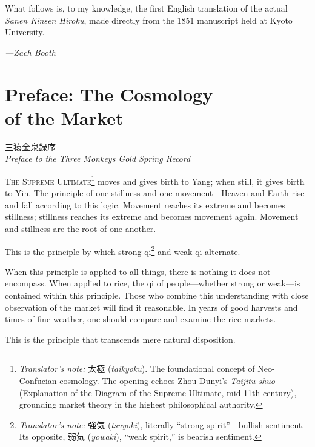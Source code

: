 \documentclass[10pt, openany]{book}
\newcommand{\jp}[1]{{\japanesefont #1}}
\newcommand{\tn}[1]{\footnote{\textit{Translator's note:} #1}}
\begin{document}
What follows is, to my knowledge, the first English translation of the
actual \textit{Sanen Kinsen Hiroku}, made directly from the 1851
manuscript held at Kyoto University.

\vspace{1em}
\begin{flushright}
\textit{---Zach Booth}
\end{flushright}

\chapter{Preface: The Cosmology\\ of the Market}

\begin{center}
\jp{三猿金泉録序}\\[0.3em]
\textit{Preface to the Three Monkeys Gold Spring Record}
\end{center}

\vspace{1em}

\lettrine[lines=2]{T}{he Supreme Ultimate}\tn{\jp{太極} (\textit{taikyoku}).
The foundational concept of Neo-Confucian cosmology. The opening echoes
Zhou Dunyi's \textit{Taijitu shuo} (Explanation of the Diagram of the
Supreme Ultimate, mid-11th century), grounding market theory in the highest
philosophical authority.}
moves and gives birth to Yang; when still, it gives birth to Yin.
The principle of one stillness and one movement---Heaven and Earth rise and
fall according to this logic. Movement reaches its extreme and becomes
stillness; stillness reaches its extreme and becomes movement again.
Movement and stillness are the root of one another.

This is the principle by which strong qi\tn{\jp{強気} (\textit{tsuyoki}),
literally ``strong spirit''---bullish sentiment. Its opposite, \jp{弱気}
(\textit{yowaki}), ``weak spirit,'' is bearish sentiment.} and weak qi
alternate.

When this principle is applied to all things, there is nothing it does not
encompass. When applied to rice, the qi of people---whether strong or
weak---is contained within this principle. Those who combine this
understanding with close observation of the market will find it reasonable.
In years of good harvests and times of fine weather, one should compare and
examine the rice markets.

This is the principle that transcends mere natural disposition.
\end{document}
